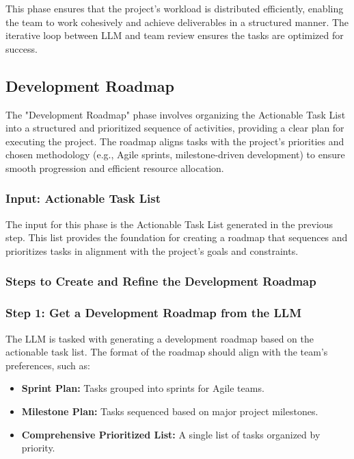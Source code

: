 \documentclass[14pt, a4paper]{article}
\begin{document}
This phase ensures that the project’s workload is distributed efficiently,
enabling the team to work cohesively and achieve deliverables in a structured
manner. The iterative loop between LLM and team review ensures the tasks are
optimized for success.

\subsection{Development Roadmap}

The "Development Roadmap" phase involves organizing the Actionable Task List
into a structured and prioritized sequence of activities, providing a clear plan
for executing the project. The roadmap aligns tasks with the project’s
priorities and chosen methodology (e.g., Agile sprints, milestone-driven
development) to ensure smooth progression and efficient resource allocation.

\subsubsection{Input: Actionable Task List}

The input for this phase is the Actionable Task List generated in the previous
step. This list provides the foundation for creating a roadmap that sequences
and prioritizes tasks in alignment with the project's goals and constraints.

\subsubsection{Steps to Create and Refine the Development Roadmap}

\subsubsection*{Step 1: Get a Development Roadmap from the LLM}

The LLM is tasked with generating a development roadmap based on the actionable
task list. The format of the roadmap should align with the team's preferences,
such as:

\begin{itemize}
    \item \textbf{Sprint Plan:} Tasks grouped into sprints for Agile teams.
    \item \textbf{Milestone Plan:} Tasks sequenced based on major project
    milestones.
    \item \textbf{Comprehensive Prioritized List:} A single list of tasks
    organized by priority.
\end{itemize}
\end{document}
